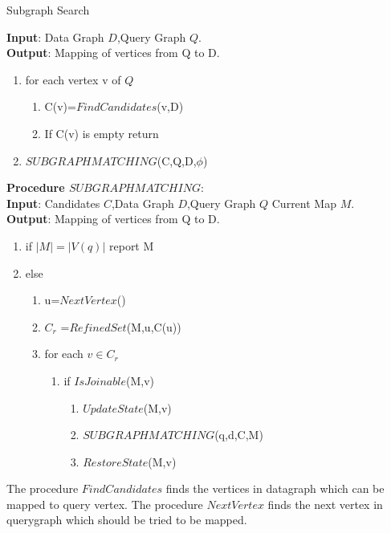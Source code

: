 \begin{algorithm}[H]
\caption{Subgraph Search}
\label{Graph Isomorphism}
\textbf{Input}: Data Graph $D$,Query Graph $Q$.\\
\textbf{Output}: Mapping of vertices from Q to D.\\
\begin{algorithmic}
 \item \begin{enumerate}
\item for each vertex v of $Q$ 
 \begin{enumerate}
\item C(v)=$FindCandidates$(v,D)
\item If C(v) is empty return 
\end{enumerate}
\item $SUBGRAPHMATCHING$(C,Q,D,$\phi$)
\end{enumerate}
\end{algorithmic}
\textbf{Procedure $SUBGRAPHMATCHING$}:\\
\textbf{Input}: Candidates $C$,Data Graph $D$,Query Graph $Q$ Current Map $M$.\\
\textbf{Output}: Mapping of vertices from Q to D.\\
\begin{algorithmic}
\item \begin{enumerate}
\item if $|M| = |V(q)| $ report M 
\item else
 \begin{enumerate}
\item u=$NextVertex$()
\item $ C_r $ =$RefinedSet$(M,u,C(u))  
\item for each $v \in C_r$ 
 \begin{enumerate}
\item if $IsJoinable$(M,v)
 \begin{enumerate}
\item $UpdateState$(M,v)
\item $SUBGRAPHMATCHING$(q,d,C,M)
\item $RestoreState$(M,v)
\end{enumerate}
\end{enumerate}
\end{enumerate}
\end{enumerate}
\end{algorithmic}
\end{algorithm}
\hspace{10mm}The procedure $FindCandidates$ finds the vertices in datagraph which can be mapped to query vertex. The procedure $NextVertex$ finds the next vertex in querygraph which should be tried to be mapped.

